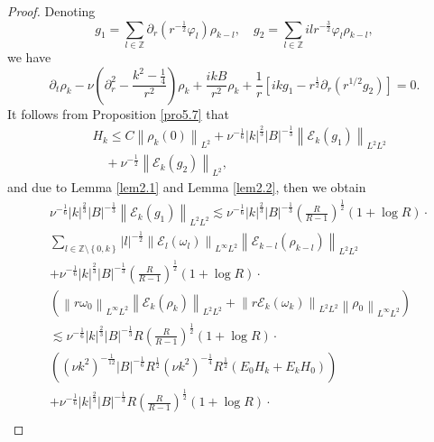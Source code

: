 \documentclass[final, 12pt,reqno]{amsart}
\numberwithin{equation}{section}
\begin{document}
\begin{proof}
 Denoting
  $$
g_1=\sum_{l \in \mathbb{Z}} \partial_r\left(r^{-\frac{1}{2}} \varphi_l\right) \rho_{k-l}, \quad g_2=\sum_{l \in \mathbb{Z}} i l r^{-\frac{3}{2}} \varphi_l \rho_{k-l},
$$
we have
        $$\partial_t \rho_k-\nu\left(\partial_r^2-\frac{k^2-\frac{1}{4}}{r^2}\right) \rho_k+\frac{i k B}{r^2} \rho_k+\frac{1}{r}\left[i k g_1-r^{\frac{1}{2}} \partial_r\left(r^{1/2}g_2\right)\right] =0.$$
     It follows from Proposition \ref{pro5.7} that
  \begin{equation}\label{6.20}
  \begin{aligned}
      &H_k\leq C\left\|\rho_k(0)\right\|_{L^2}+\nu^{-\frac{1}{6}}|k|^{\frac{2}{3}}|B|^{-\frac{1}{3}}\left\|\mathcal{E}_k (g_1)\right\|_{L^2 L^2}\\
        &\quad+\nu^{-\frac{1}{2}}\left\|\mathcal{E}_k(g_2)\right\|_{L^2},
        \end{aligned}
   \end{equation}
   and due to Lemma \ref{lem2.1} and Lemma \ref{lem2.2}, then we obtain
 \begin{equation}\label{6.21}
\begin{aligned}
    &\nu^{-\frac{1}{6}}|k|^{\frac{2}{3}}|B|^{-\frac{1}{3}}\left\|\mathcal{E}_k  (g_1)\right\|_{L^2 L^2}
     \lesssim \nu^{-\frac{1}{6}}|k|^{\frac{2}{3}}|B|^{-\frac{1}{3}}\left(\frac{R}{R-1}\right)^{\frac{1}{2}}(1+\log R) \cdot\\
 &\sum_{ l\in \mathbb{Z} \setminus\left\lbrace 0, k\right\rbrace }|l|^{-\frac{1}{2}}\left\|\mathcal{E}_l(\omega_l)\right\|_{L^\infty L^2}\left\|\mathcal{E}_{k-l}(\rho_{k-l})\right\|_{L^2L^2}\\
 &+\nu^{-\frac{1}{6}}|k|^{\frac{2}{3}}|B|^{-\frac{1}{3}}\left(\frac{R}{R-1}\right)^{\frac{1}{2}}(1+\log R) \cdot\\
 &\left(\left\|r\omega_0\right\|_{L^\infty L^2}\left\|\mathcal{E}_k(\rho_k)\right\|_{L^2L^2}+\left\|r\mathcal{E}_k(\omega_k)\right\|_{L^2 L^2}\left\|\rho_0\right\|_{L^\infty L^2} \right)\\
&   \lesssim  \nu^{-\frac{1}{6}}|k|^{\frac{2}{3}}|B|^{-\frac{1}{3}}R \left(\frac{R}{R-1}\right)^{\frac{1}{2}}(1+\log R) \cdot \\
    & \left( \left(\nu k^2\right)^{-\frac{1}{12}}|B|^{-\frac{1}{6}} R^{\frac{1}{2}} (\nu k^2)^{-\frac{1}{4}}R^{\frac{1}{2}}(E_0 H_k+E_kH_0)\right)\\
 &+\nu^{-\frac{1}{6}}|k|^{\frac{2}{3}}|B|^{-\frac{1}{3}}R \left(\frac{R}{R-1}\right)^{\frac{1}{2}}(1+\log R) \cdot \\

\end{aligned}
\end{equation}
\end{proof}
\end{document}
